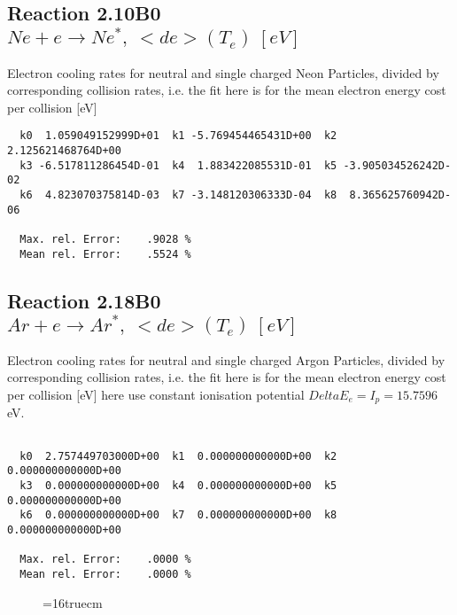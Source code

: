 \documentclass[12pt,dvipdfmx]{article}
\begin{document}
\subsection{
Reaction 2.10B0   $  Ne + e \rightarrow Ne^*,  \ <de>(T_e) \ [eV] $
}

 Electron cooling rates for neutral and single
 charged Neon Particles, divided by corresponding collision rates, i.e. the fit here is for the mean electron energy cost per collision [eV]

\begin{small}\begin{verbatim}
  k0  1.059049152999D+01  k1 -5.769454465431D+00  k2  2.125621468764D+00
  k3 -6.517811286454D-01  k4  1.883422085531D-01  k5 -3.905034526242D-02
  k6  4.823070375814D-03  k7 -3.148120306333D-04  k8  8.365625760942D-06

  Max. rel. Error:    .9028 %
  Mean rel. Error:    .5524 %

\end{verbatim}\end{small}


\subsection{
Reaction 2.18B0  $   Ar + e \rightarrow Ar^*,  \ <de>(T_e) \ [eV] $
}

  Electron cooling rates for neutral and single
  charged Argon Particles, divided by corresponding collision rates, i.e. the fit here is for the mean electron energy cost per collision [eV]
  here use constant ionisation potential $Delta E_e = I_p = 15.7596$ eV.


\begin{small}\begin{verbatim}

  k0  2.757449703000D+00  k1  0.000000000000D+00  k2  0.000000000000D+00
  k3  0.000000000000D+00  k4  0.000000000000D+00  k5  0.000000000000D+00
  k6  0.000000000000D+00  k7  0.000000000000D+00  k8  0.000000000000D+00

  Max. rel. Error:    .0000 %
  Mean rel. Error:    .0000 %

\end{verbatim}\end{small}

\begin{figure} \label{2.18ll}
\epsfxsize=16truecm
\end{figure}
\newpage
\end{document}
